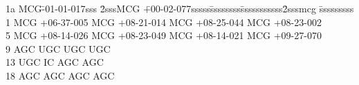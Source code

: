 \documentclass{article}
\begin{document}
\begin{tabbing}
1a MCG\= -01-01-017sss \= 2sssMCG \=+00-02-077sssss\= ssssssss\=sssssssssss\= 2sssmcg \=sssssssss\kill
 1 MCG    \>             +06-37-005    MCG   \>              +08-21-014   MCG       \>          +08-25-044       MCG      \>           +08-23-002     \\%
   5 MCG   \>              +08-14-026     MCG    \>             +08-23-049     MCG   \>              +08-14-021    MCG    \>             +09-27-070      \\%
   9 AGC          UGC            UGC          UGC              \\%
  13 UGC            IC         AGC     AGC           \\%
   18 AGC      AGC      AGC     AGC       \\%

\end{tabbing}
\end{document}
